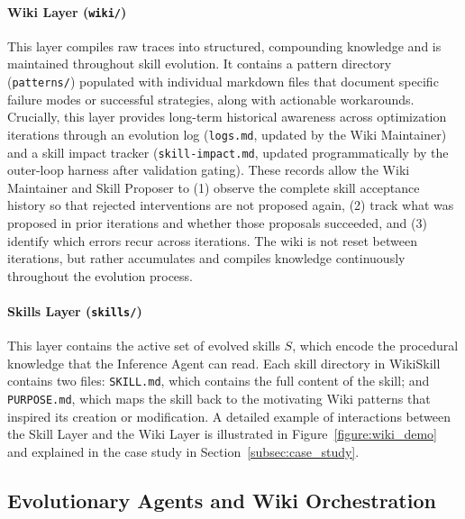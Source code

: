 \documentclass[11pt, a4paper, copyright, gr]{google}
\newcommand{\method}{WikiSkill\xspace}
\begin{document}
\paragraph{Wiki Layer (\texttt{wiki/})}
This layer compiles raw traces into structured, compounding knowledge and is maintained throughout skill evolution. It contains a pattern directory (\texttt{patterns/}) populated with individual markdown files that document specific failure modes or successful strategies, along with actionable workarounds. Crucially, this layer provides long-term historical awareness across optimization iterations through an evolution log (\texttt{logs.md}, updated by the Wiki Maintainer) and a skill impact tracker (\texttt{skill-impact.md}, updated programmatically by the outer-loop harness after validation gating). These records allow the Wiki Maintainer and Skill Proposer to (1) observe the complete skill acceptance history so that rejected interventions are not proposed again, (2) track what was proposed in prior iterations and whether those proposals succeeded, and (3) identify which errors recur across iterations. The wiki is not reset between iterations, but rather accumulates and compiles knowledge continuously throughout the evolution process.

\paragraph{Skills Layer (\texttt{skills/})}
This layer contains the active set of evolved skills $S$, which encode the procedural knowledge that the Inference Agent can read. Each skill directory in \method contains two files: \texttt{SKILL.md}, which contains the full content of the skill; and \texttt{PURPOSE.md}, which maps the skill back to the motivating Wiki patterns that inspired its creation or modification. A detailed example of interactions between the Skill Layer and the Wiki Layer is illustrated in Figure~\ref{figure:wiki_demo} and explained in the case study in Section~\ref{subsec:case_study}.

\subsection{Evolutionary Agents and Wiki Orchestration}
\label{subsec:agents}
\end{document}
